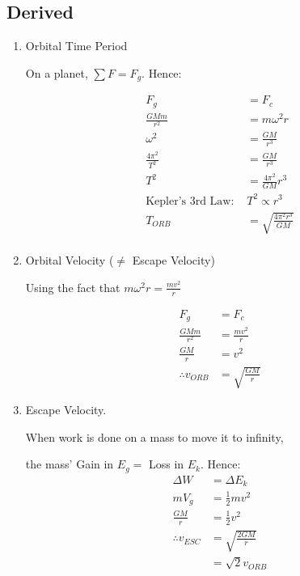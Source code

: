 \documentclass[11pt,a4paper]{article}
\begin{document}
\subsection{Derived}
\begin{enumerate}
    \item Orbital Time Period
    
    On a planet, $\sum F = F_g$. Hence:

    \begin{equation}
    \begin{aligned}
        F_g &= F_c\\
        \frac{GMm}{r^2} &= m\omega^2r\\
        \omega^2 &= \frac{GM}{r^3}\\
        \frac{4\pi^2}{T^2} &= \frac{GM}{r^3}\\
        T^2 &= \frac{4\pi^2}{GM}r^3\\
\text{Kepler's 3rd Law: } & T^2 \propto r^3\\
        T_{ORB} &= \sqrt{\frac{4\pi^2r^3}{GM}}\\
    \end{aligned}
    \end{equation}

    \item Orbital Velocity ($\neq$ Escape Velocity)

    Using the fact that $m\omega^2r = \frac{mv^2}{r}$
    
    \begin{equation}
    \begin{aligned}
        F_g &= F_c\\
        \frac{GMm}{r^2} &= \frac{mv^2}{r}\\
        \frac{GM}{r} &= v^2\\
        \therefore v_{ORB} &= \sqrt{\frac{GM}{r}}
    \end{aligned}
    \end{equation}
    \clearpage
   
    \item Escape Velocity.
    
    When work is done on a mass to move it to infinity,
    
    the mass' Gain in $E_g =$ Loss in $E_k$. Hence:
    \begin{equation}
    \begin{aligned}
        \Delta W &= \Delta E_k\\
        mV_g &= \frac{1}{2}mv^2\\
        \frac{GM}{r} &= \frac{1}{2}v^2\\
        \therefore v_{ESC} &= \sqrt{\frac{2GM}{r}}\\
        &= \sqrt{2}v_{ORB}
    \end{aligned}
    \end{equation}


\end{enumerate}
\end{document}
